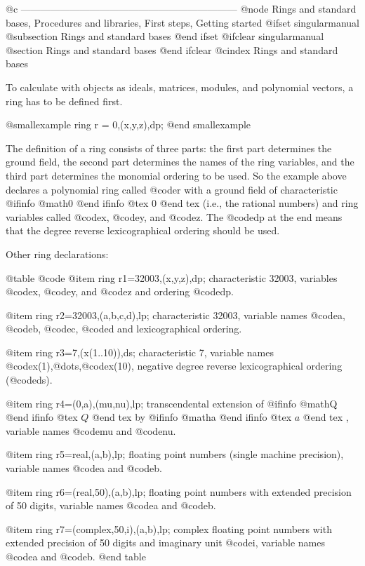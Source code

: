 @c ------------------------------------------------------------------
@node Rings and standard bases, Procedures and libraries, First steps, Getting started
@ifset singularmanual
@subsection Rings and standard bases
@end ifset
@ifclear singularmanual
@section Rings and standard bases
@end ifclear
@cindex Rings and standard bases

To calculate with objects as ideals, matrices, modules, and polynomial
vectors, a ring has to be defined first.

@smallexample
ring r = 0,(x,y,z),dp;
@end smallexample

The definition of a ring consists of three parts: the first part
determines the ground field, the second part determines the names of the
ring variables, and the third part determines the monomial ordering to
be used. So the example above declares a polynomial ring called @code{r}
with a ground field of characteristic 
@ifinfo
@math{0}
@end ifinfo
@tex
$0$
@end tex
 (i.e., the rational
numbers) and ring variables called @code{x}, @code{y}, and @code{z}. The
@code{dp} at the end means that the degree reverse lexicographical
ordering should be used.

Other ring declarations:

@table @code
@item ring r1=32003,(x,y,z),dp;
characteristic 32003, variables @code{x}, @code{y}, and @code{z} and
ordering @code{dp}.

@item ring r2=32003,(a,b,c,d),lp;
characteristic 32003, variable names @code{a}, @code{b}, @code{c},
@code{d} and lexicographical ordering.

@item ring r3=7,(x(1..10)),ds;
characteristic 7, variable names @code{x(1)},@dots{},@code{x(10)}, negative
degree reverse lexicographical ordering (@code{ds}).

@item ring r4=(0,a),(mu,nu),lp;
transcendental extension of 
@ifinfo
@math{Q}
@end ifinfo
@tex
$Q$
@end tex
 by 
@ifinfo
@math{a}
@end ifinfo
@tex
$a$
@end tex
, variable names
@code{mu} and @code{nu}.

@item ring r5=real,(a,b),lp;
floating point numbers (single machine precision),
variable names @code{a} and @code{b}.

@item ring r6=(real,50),(a,b),lp;
floating point numbers with extended precision of 50 digits,
variable names @code{a} and @code{b}.

@item ring r7=(complex,50,i),(a,b),lp;
complex floating point numbers with extended precision of 50 digits
and imaginary unit @code{i},
variable names @code{a} and @code{b}.
@end table

